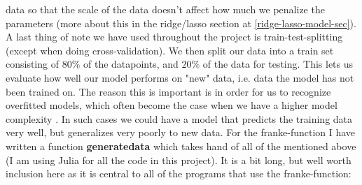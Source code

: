\documentclass{article}
\begin{document}
data so that the scale of the data doesn't affect how much we penalize the
parameters (more about this in the ridge/lasso section at
\ref{ridge-lasso-model-sec}).
\\
A last thing of note we have used throughout the project is train-test-splitting
(except when doing cross-validation). We then split our data into a train set
consisting of $80\%$ of the datapoints, and $20\%$ of the data for testing.
This lets us evaluate how well our model performs on "new" data, i.e. data the
model has not been trained on. The reason this is important is in order for us
to recognize overfitted models, which often become the case when we have a
higher model complexity \cite[s.~7.2]{hastie2009elements}. In such cases we
could have a model that predicts the training data very well, but generalizes
very poorly to new data.  For the franke-function I have written a function
\textbf{generatedata} which takes hand of all of the mentioned above (I am using
Julia for all the code in this project). It is a bit long, but well worth
inclusion here as it is central to all of the programs that use the
franke-function:
\end{document}
